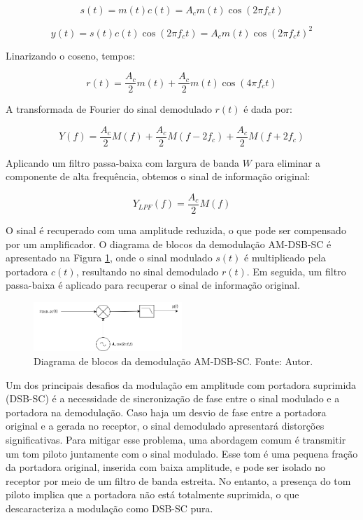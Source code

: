 \begin{equation}
    s(t) = m(t) c(t) = A_{c} m(t) \cos(2 \pi f_{c} t)
\end{equation}

\begin{equation}
    y(t) = s(t) c(t) \cos(2 \pi f_{c}t)= A_{c} m(t) \cos(2 \pi f_{c} t)^{2}
\end{equation}

Linarizando o coseno, tempos:

\begin{equation}
    r(t) = \frac{A_{c}}{2} m(t) + \frac{A_{c}}{2} m(t) \cos(4 \pi f_{c} t)
\end{equation}

A transformada de Fourier do sinal demodulado $r(t)$ é dada por:

\begin{equation}
    Y(f) = \frac{A_{c}}{2} M(f) + \frac{A_{c}}{2} M(f - 2 f_{c}) + \frac{A_{c}}{2} M(f + 2 f_{c})
\end{equation}

Aplicando um filtro passa-baixa com largura de banda $W$ para eliminar a componente de alta frequência, obtemos o sinal de informação original:

\begin{equation}
    Y_{LPF}(f) = \frac{A_{c}}{2} M(f)
\end{equation}

O sinal é recuperado com uma amplitude reduzida, o que pode ser compensado por um amplificador. O diagrama de blocos da demodulação AM-DSB-SC é apresentado na Figura \ref{fig:demodulacao_am}, onde o sinal modulado $s(t)$ é multiplicado pela portadora $c(t)$, resultando no sinal demodulado $r(t)$. Em seguida, um filtro passa-baixa é aplicado para recuperar o sinal de informação original.

\begin{figure}[h]
    \centering
    \includegraphics[width=0.5\textwidth]{images/demodulacao_am.png}
    \caption{Diagrama de blocos da demodulação AM-DSB-SC. Fonte: Autor.}
    \label{fig:demodulacao_am}
\end{figure}

Um dos principais desafios da modulação em amplitude com portadora suprimida (DSB-SC) é a necessidade de sincronização de fase entre o sinal modulado e a portadora na demodulação. Caso haja um desvio de fase entre a portadora original e a gerada no receptor, o sinal demodulado apresentará distorções significativas. Para mitigar esse problema, uma abordagem comum é transmitir um tom piloto juntamente com o sinal modulado. Esse tom é uma pequena fração da portadora original, inserida com baixa amplitude, e pode ser isolado no receptor por meio de um filtro de banda estreita. No entanto, a presença do tom piloto implica que a portadora não está totalmente suprimida, o que descaracteriza a modulação como DSB-SC pura.

